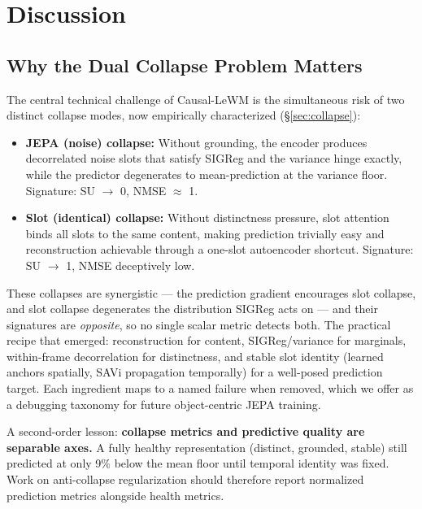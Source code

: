 \documentclass[12pt]{article}
\begin{document}
\section{Discussion}

\subsection{Why the Dual Collapse Problem Matters}

The central technical challenge of Causal-LeWM is the simultaneous risk of two distinct collapse modes, now empirically characterized (\S\ref{sec:collapse}):

\begin{itemize}[leftmargin=*]
    \item \textbf{JEPA (noise) collapse:} Without grounding, the encoder produces decorrelated noise slots that satisfy SIGReg and the variance hinge exactly, while the predictor degenerates to mean-prediction at the variance floor. Signature: SU $\rightarrow$ 0, NMSE $\approx$ 1.
    \item \textbf{Slot (identical) collapse:} Without distinctness pressure, slot attention binds all slots to the same content, making prediction trivially easy and reconstruction achievable through a one-slot autoencoder shortcut. Signature: SU $\rightarrow$ 1, NMSE deceptively low.
\end{itemize}

These collapses are synergistic --- the prediction gradient encourages slot collapse, and slot collapse degenerates the distribution SIGReg acts on --- and their signatures are \emph{opposite}, so no single scalar metric detects both. The practical recipe that emerged: reconstruction for content, SIGReg/variance for marginals, within-frame decorrelation for distinctness, and stable slot identity (learned anchors spatially, SAVi propagation temporally) for a well-posed prediction target. Each ingredient maps to a named failure when removed, which we offer as a debugging taxonomy for future object-centric JEPA training.

A second-order lesson: \textbf{collapse metrics and predictive quality are separable axes.} A fully healthy representation (distinct, grounded, stable) still predicted at only 9\% below the mean floor until temporal identity was fixed. Work on anti-collapse regularization should therefore report normalized prediction metrics alongside health metrics.
\end{document}
